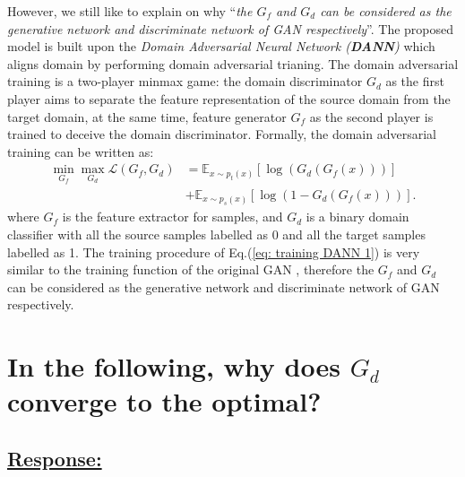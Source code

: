 However, we still like to explain on why ``\textit{the $G_f$ and $G_d$ can be considered as the generative network and discriminate network of GAN respectively}''.
The proposed model is built upon the \textit{Domain Adversarial Neural Network (\textbf{DANN})} \cite{DomainAdversrialNetwork} which aligns domain by performing domain adversarial trianing.
The domain adversarial training is a two-player minmax game:
the domain discriminator $G_d$ as the first player aims to separate the feature representation of the source domain from the target domain, at the same time, feature generator $G_f$ as the second player is trained to deceive the domain discriminator.
Formally, the domain adversarial training can be written as:
\begin{equation}
    \label{eq: training DANN 1}
    \begin{split}
        \min_{G_f} \max_{G_d} \mathscr{L}(G_f,G_d) &=\mathbb{E}_{x\sim p_t(x)} \left[ \log \left(G_d\left(G_f\left(x\right)\right)\right) \right]\\
        &+\mathbb{E}_{x\sim p_s(x)}\left[ \log \left(1-G_d\left(G_f\left(x\right)\right)\right) \right].
    \end{split}
\end{equation}
where $G_f$ is the feature extractor for samples, and $G_d$ is a binary domain classifier with all the source samples labelled as 0 and all the target samples labelled as 1.
The training procedure of Eq.(\ref{eq: training DANN 1}) is very similar to the training function of the original GAN \cite{goodfellow2014generative}, therefore the $G_f$ and $G_d$ can be considered as the generative network and discriminate network of GAN respectively.

\section{In the following, why does $G_d$ converge to the optimal?}
\subsection*{\underline{\textbf{Response:}}}

